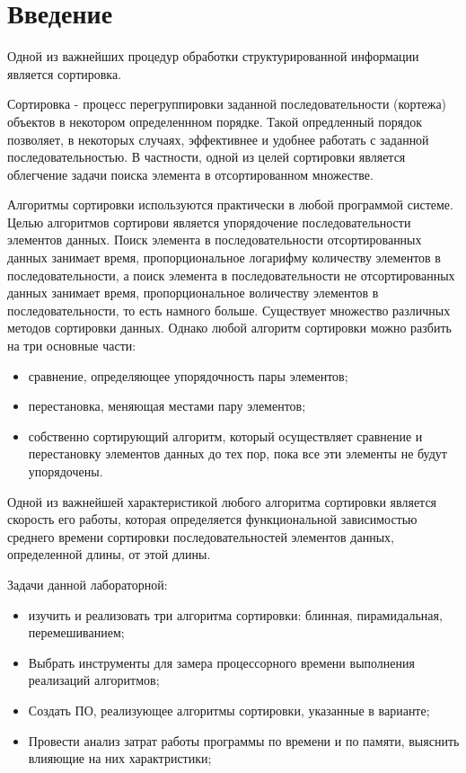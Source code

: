 \chapter*{Введение}

Одной из важнейших процедур обработки структурированной информации является сортировка.

Сортировка - процесс перегруппировки заданной последовательности (кортежа) объектов в
некотором определеннном порядке. Такой опредленный порядок позволяет, в некоторых случаях,
эффективнее и удобнее работать с заданной последовательностью. В частности, одной из
целей сортировки является облегчение задачи поиска элемента в отсортированном множестве. 

Алгоритмы сортировки используются практически в любой программой системе. 
Целью алгоритмов сортирови является упорядочение последовательности элементов данных. 
Поиск элемента в последовательности отсортированных данных занимает время, пропорциональное
логарифму количеству элементов в последовательности, а поиск элемента в последовательности
не отсортированных данных занимает время, пропорциональное воличеству элементов в
последовательности, то есть намного больше. Существует множество различных методов 
сортировки данных. Однако любой алгоритм сортировки можно разбить на три основные части:

\begin{itemize}
	\item сравнение, определяющее упорядочность пары элементов;
	\item перестановка, меняющая местами пару элементов;
	\item собственно сортирующий алгоритм, который осуществляет сравнение
	и перестановку элементов данных до тех пор, пока все эти элементы
	не будут упорядочены.
\end{itemize}

Одной из важнейшей характеристикой любого алгоритма сортировки является скорость 
его работы, которая определяется функциональной зависимостью среднего времени сортировки
последовательностей элементов данных, определенной длины, от этой длины.


\leavevmode\newline
Задачи данной лабораторной:
\begin{itemize}
	\item изучить и реализовать три алгоритма сортировки: блинная, пирамидальная, перемешиванием;
	\item Выбрать инструменты для замера процессорного времени выполнения реализаций алгоритмов;
	\item Создать ПО, реализующее алгоритмы сортировки, указанные в варианте;
	\item Провести анализ затрат работы программы по времени и по памяти, выяснить влияющие на них характристики;
\end{itemize}
